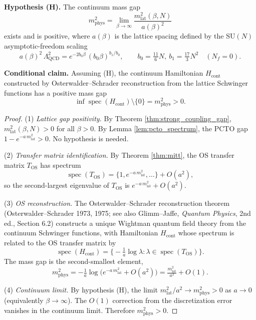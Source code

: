 \begin{theorem}
\label{thm:clay_main_H}
\textbf{Hypothesis (H).} The continuum mass gap
\begin{equation}
  \label{eq:H}
  m_{\mathrm{phys}}^{2}
  = \lim_{\beta \to \infty} \frac{m_{\mathrm{lat}}^{2}(\beta, N)}{a(\beta)^{2}}
\end{equation}
exists and is positive, where $a(\beta)$ is the lattice spacing
defined by the $\mathrm{SU}(N)$ asymptotic-freedom scaling
\[
  a(\beta)^{2}\, \Lambda_{\mathrm{QCD}}^{2}
  = e^{-2 b_{0} \beta}\, (b_{0} \beta)^{b_{1}/b_{0}},
  \qquad b_{0} = \tfrac{11}{6} N, \ b_{1} = \tfrac{17}{3} N^{2}
  \quad (N_{f} = 0).
\]
\medskip

\noindent\textbf{Conditional claim.} Assuming (H), the continuum
Hamiltonian $H_{\mathrm{cont}}$ constructed by Osterwalder--Schrader
reconstruction from the lattice Schwinger functions has a positive
mass gap
\[
  \inf \operatorname{spec}(H_{\mathrm{cont}}) \setminus \{0\}
  = m_{\mathrm{phys}}^{2} > 0.
\]
\end{theorem}

\begin{proof}
(1) \emph{Lattice gap positivity.} By Theorem
\ref{thm:strong_coupling_gap}, $m_{\mathrm{lat}}^{2}(\beta, N) > 0$
for all $\beta > 0$. By Lemma \ref{lem:pcto_spectrum}, the PCTO gap
$1 - e^{-a\, m_{\mathrm{lat}}^{2}} > 0$. No hypothesis is needed.

(2) \emph{Transfer matrix identification.} By Theorem \ref{thm:mitt},
the OS transfer matrix $T_{\mathrm{OS}}$ has spectrum
\[
  \operatorname{spec}(T_{\mathrm{OS}})
  = \{1, e^{-a\, m_{\mathrm{lat}}^{2}}, \ldots\}
  + O(a^{2}),
\]
so the second-largest eigenvalue of $T_{\mathrm{OS}}$ is
$e^{-a\, m_{\mathrm{lat}}^{2}} + O(a^{2})$.

(3) \emph{OS reconstruction.} The Osterwalder--Schrader reconstruction
theorem (Osterwalder--Schrader 1973, 1975; see also Glimm--Jaffe,
\emph{Quantum Physics}, 2nd ed., Section 6.2) constructs a unique
Wightman quantum field theory from the continuum Schwinger functions,
with Hamiltonian $H_{\mathrm{cont}}$ whose spectrum is related to the
OS transfer matrix by
\[
  \operatorname{spec}(H_{\mathrm{cont}})
  = \bigl\{-\tfrac{1}{a}\log\lambda : \lambda \in
  \operatorname{spec}(T_{\mathrm{OS}})\bigr\}.
\]
The mass gap is the second-smallest element,
\[
  m_{\mathrm{phys}}^{2}
  = -\tfrac{1}{a}\log\!\bigl(e^{-a\, m_{\mathrm{lat}}^{2}} + O(a^{2})\bigr)
  = \tfrac{m_{\mathrm{lat}}^{2}}{a^{2}} + O(1).
\]

(4) \emph{Continuum limit.} By hypothesis (H), the limit
$m_{\mathrm{lat}}^{2}/a^{2} \to m_{\mathrm{phys}}^{2} > 0$ as
$a \to 0$ (equivalently $\beta \to \infty$). The $O(1)$ correction
from the discretization error vanishes in the continuum limit.
Therefore $m_{\mathrm{phys}}^{2} > 0$. \end{proof}


